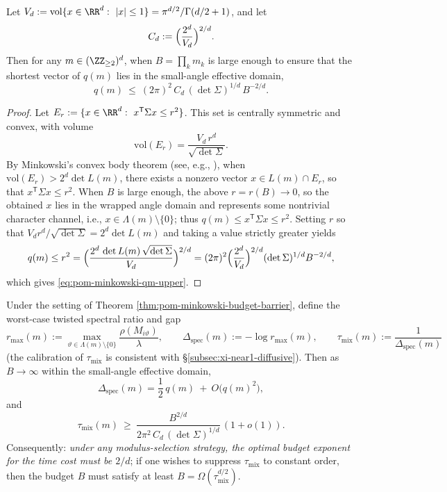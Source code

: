 \begin{theorem}\label{thm:pom-minkowski-budget-barrier}
Let \(V_d:=\mathrm{vol}\{x\in\RR^d:\ |x|\le 1\}=\pi^{d/2}/\Gamma(d/2+1)\), and let
\[
C_d:=\Bigl(\frac{2^{d}}{V_d}\Bigr)^{2/d}.
\]
Then for any \(m\in(\ZZ_{\ge 2})^d\), when \(B=\prod_k m_k\) is large enough to ensure that the shortest vector of \(q(m)\) lies in the small-angle effective domain,
\begin{equation}\label{eq:pom-minkowski-qm-upper}
q(m)\ \le\ (2\pi)^2\,C_d\,(\det\Sigma)^{1/d}\,B^{-2/d}.
\end{equation}
\end{theorem}

\begin{proof}
Let \(E_r:=\{x\in\RR^d:\ x^{\mathsf T}\Sigma x\le r^2\}\).
This set is centrally symmetric and convex, with volume
\[
\mathrm{vol}(E_r)=\frac{V_d\,r^d}{\sqrt{\det\Sigma}}.
\]
By Minkowski's convex body theorem (see, e.g., \cite{Cassels1957}), when \(\mathrm{vol}(E_r)>2^d\det L(m)\), there exists a nonzero vector \(x\in L(m)\cap E_r\), so that \(x^{\mathsf T}\Sigma x\le r^2\).
When \(B\) is large enough, the above \(r=r(B)\to 0\), so the obtained \(x\) lies in the wrapped angle domain and represents some nontrivial character channel, i.e., \(x\in\Lambda(m)\setminus\{0\}\);
thus \(q(m)\le x^{\mathsf T}\Sigma x\le r^2\).
Setting \(r\) so that
\(
V_d r^d/\sqrt{\det\Sigma}=2^d\det L(m)
\)
and taking a value strictly greater yields
\[
q(m)
\le r^2
=\Bigl(\frac{2^d\,\det L(m)\,\sqrt{\det\Sigma}}{V_d}\Bigr)^{2/d}
=(2\pi)^2\Bigl(\frac{2^d}{V_d}\Bigr)^{2/d}(\det\Sigma)^{1/d}B^{-2/d},
\]
which gives \eqref{eq:pom-minkowski-qm-upper}.
\end{proof}

\begin{corollary}\label{cor:pom-multi-axis-mixing-budget-barrier}
Under the setting of Theorem \ref{thm:pom-minkowski-budget-barrier}, define the worst-case twisted spectral ratio and gap
\[
r_{\max}(m):=\max_{\vartheta\in \Lambda(m)\setminus\{0\}}\frac{\rho(M_{i\vartheta})}{\lambda},
\qquad
\Delta_{\mathrm{spec}}(m):=-\log r_{\max}(m),
\qquad
\tau_{\mathrm{mix}}(m):=\frac{1}{\Delta_{\mathrm{spec}}(m)}
\]
(the calibration of \(\tau_{\mathrm{mix}}\) is consistent with \S\ref{subsec:xi-near1-diffusive}).
Then as \(B\to\infty\) within the small-angle effective domain,
\begin{equation}\label{eq:pom-multi-axis-gap-qm}
\Delta_{\mathrm{spec}}(m)=\frac12\,q(m)\ +\ O\!\bigl(q(m)^2\bigr),
\end{equation}
and
\begin{equation}\label{eq:pom-multi-axis-taumix-lb}
\tau_{\mathrm{mix}}(m)\ \ge\ \frac{B^{2/d}}{2\pi^2\,C_d\,(\det\Sigma)^{1/d}}\,(1+o(1)).
\end{equation}
Consequently: \emph{under any modulus-selection strategy, the optimal budget exponent for the time cost must be \(2/d\)}; if one wishes to suppress \(\tau_{\mathrm{mix}}\) to constant order, then the budget \(B\) must satisfy at least \(B=\Omega(\tau_{\mathrm{mix}}^{d/2})\).
\end{corollary}

